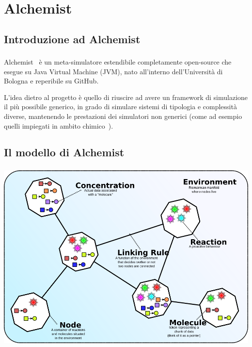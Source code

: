 \documentclass[%
]{beamer}
\begin{document}
    \section{Alchemist}\label{sec:alchemist}

    \subsection{Introduzione ad Alchemist}\label{subsec:alchIntro}
    \begin{frame}
        \frametitle{\insertsection}
        \framesubtitle{\insertsubsection}

        Alchemist~\cite{alchemist2013} è un meta-simulatore estendibile completamente open-source che esegue su Java Virtual Machine (JVM), nato all’interno dell’Università di Bologna e reperibile su GitHub.

        \medskip
        \pause

        L'idea dietro al progetto è quello di riuscire ad avere un framework di simulazione il più possibile generico, in grado di simulare sistemi di tipologia e complessità diverse, mantenendo le prestazioni dei simulatori non generici (come ad esempio quelli impiegati in ambito chimico~\cite{gillespie1976}).
    \end{frame}

    \subsection{Il modello di Alchemist}\label{subsec:alchModel}
    \begin{frame}
        \frametitle{\insertsection}
        \framesubtitle{\insertsubsection}

        \centering
        \includegraphics[scale=.34]{fig/alchemist_model}
    \end{frame}
\end{document}
